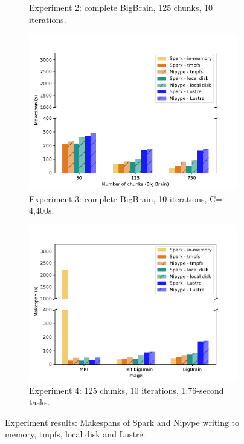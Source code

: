 \begin{figure}
\begin{subfigure}{0.5\columnwidth}
    \caption{Experiment 2: complete BigBrain, 125 chunks, 10
    iterations.}\label{fig:inmem:cputime}
\end{subfigure}
\begin{subfigure}{0.5\columnwidth}
    \centering
    \captionsetup{width=.85\linewidth}
    \includegraphics[width=\linewidth]{figures/inmem/numchunks.pdf}
    \caption{Experiment 3: complete BigBrain, 10 iterations, C=
    4,400s.}\label{fig:inmem:numchunks}
\end{subfigure}
\begin{subfigure}{0.5\columnwidth}
    \centering
    \captionsetup{width=.85\linewidth}
    \includegraphics[width=\linewidth]{figures/inmem/datasize.pdf}
    \caption{Experiment 4: 125 chunks, 10 iterations, 1.76-second
    tasks.}\label{fig:inmem:datasize}
\end{subfigure}
\setlength{\belowcaptionskip}{-10pt}
\caption{Experiment results: Makespans of Spark and Nipype writing to memory, tmpfs, local disk and Lustre.}
\label{fig:inmem:results}
\end{figure}
